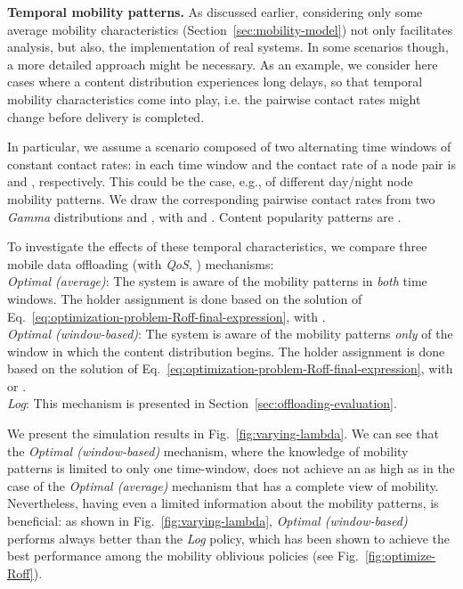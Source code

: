 \documentclass[journal]{IEEEtran}
\newcommand{\eq}[1]{Eq.~\eqref{#1}}
\newcommand{\revisionRed}[1]{{#1}}\newcommand{\red}[1]{{#1}}
\begin{document}
\revisionRed{
\textbf{Temporal mobility patterns.} As discussed earlier, considering only some average mobility characteristics (Section~\ref{sec:mobility-model}) not only facilitates analysis, but also, the implementation of real systems. In some scenarios though, a more detailed approach might be necessary. As an example, we consider here cases where a content distribution experiences long delays, so that temporal mobility characteristics come into play, i.e. the pairwise contact rates  might change before delivery is completed. 
}

\revisionRed{
In particular, we assume a scenario composed of two alternating time windows of constant contact rates: in each time window  and  the contact rate of a node pair  is  and , respectively. This could be the case, e.g., of different day/night node mobility patterns. We draw the corresponding pairwise contact rates from two \textit{Gamma} distributions  and , with  and . Content popularity patterns are .
}

\revisionRed{
To investigate the effects of these temporal characteristics, we compare three mobile data offloading (with \textit{QoS}, ) mechanisms:\\
{\textit{Optimal (average)}}: The system is aware of the mobility patterns in \textit{both} time windows. The holder assignment is done based on the solution of \eq{eq:optimization-problem-Roff-final-expression}, with .\\
{\textit{Optimal (window-based)}}: The system is aware of the mobility patterns \textit{only} of the window in which the content distribution begins. The holder assignment is done based on the solution of \eq{eq:optimization-problem-Roff-final-expression}, with  or .\\
{\textit{Log}}: This mechanism is presented in Section~\ref{sec:offloading-evaluation}.
}

\revisionRed{
We present the simulation results in Fig.~\ref{fig:varying-lambda}. We can see that the \textit{Optimal (window-based)} mechanism, where the knowledge of mobility patterns is limited to only one time-window, does not achieve an  as high as in the case of the \textit{Optimal (average)} mechanism that has a complete view of mobility. Nevertheless, having even a limited information about the mobility patterns, is beneficial: as shown in Fig.~\ref{fig:varying-lambda}, \textit{Optimal (window-based)} performs always better than the \textit{Log} policy, which has been shown to achieve the best performance among the mobility oblivious policies (see Fig.~\ref{fig:optimize-Roff}).
}
\end{document}
